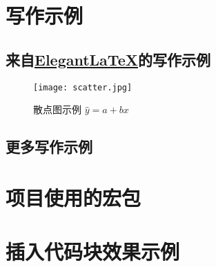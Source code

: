 \documentclass[12pt, green]{uglyrep}
\begin{document}


\chapter{写作示例}

\section{来自\href{https://github.com/ElegantLaTeX/}{Elegant\LaTeX}的写作示例}


\begin{figure}[htbp]
  \centering
  \texttt{[image: scatter.jpg]}
  \caption{散点图示例 $\hat{y}=a+bx$ \label{fig:scatter}}
\end{figure}

\section{更多写作示例}


\printbibliography[
  title=\ebibname
]

\clearpage
\appendix
\appendixpage
\addappheadtotoc

\chapter{项目使用的宏包}


\chapter{插入代码块效果示例}

\end{document}
